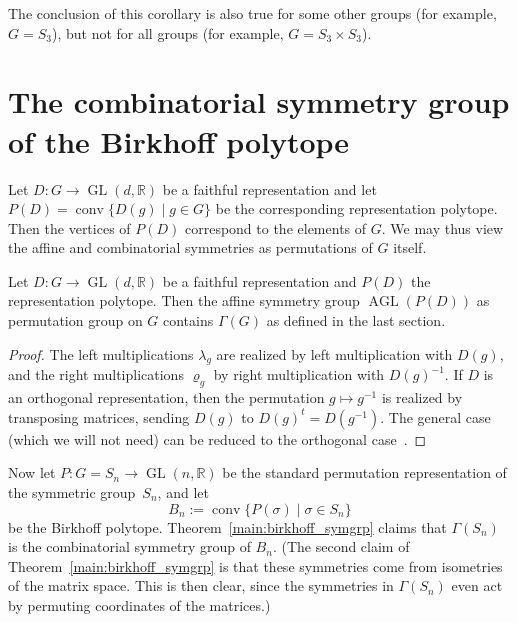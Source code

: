 \documentclass[ALCO,Unicode]{cedram}
\renewcommand{\rho}{\varrho}
\newcommand{\reals}{\mathbb{R}}
\DeclareMathOperator{\GL}{GL}
\DeclareMathOperator{\AGL}{AGL}
\DeclareMathOperator{\conv}{conv}
\begin{document}
The conclusion of this corollary is also true for some other
groups (for example, $G=S_3$),
but not for all groups (for example, $G= S_3 \times S_3$).

\section{The combinatorial symmetry group of the Birkhoff polytope}
Let $D\colon G \to \GL(d,\reals)$ be a faithful representation
and let $P(D) = \conv\{ D(g) \mid g\in G \}$
be the corresponding representation polytope.
Then the vertices of $P(D)$ correspond to the elements of $G$.
We may thus view the affine and combinatorial symmetries
as permutations of $G$ itself.

\begin{lemma}\label{l:reppoltrivsyms}
  Let 
  $D\colon G\to \GL(d,\reals)$
  be a faithful representation
  and $P(D)$ the representation polytope.  
  Then the affine symmetry group $\AGL(P(D))$ 
  as permutation group on $G$ contains 
  $\Gamma(G)$ as defined in the last section.
\end{lemma}

\begin{proof}
  The left multiplications $\lambda_g$ are realized
  by left multiplication with 
  $D(g)$, and the right multiplications $\rho_g$
  by right multiplication with $D(g)^{-1}$.
  If $D$ is an orthogonal representation, then the 
  permutation $g\mapsto g^{-1}$ is realized by transposing 
  matrices, sending $D(g) $ to $D(g)^t = D(g^{-1})$.
  The general case (which we will not need)
  can be reduced to the orthogonal 
  case~\cite[Prop.~6.4]{FrieseLadisch16}.
\end{proof}



Now let $P\colon G= S_n \to \GL(n,\reals)$ be the 
standard permutation representation of 
the symmetric group~$S_n$, and let
\[ B_n := \conv\{ P(\sigma) \mid \sigma\in S_n\}
\]
be the Birkhoff polytope.
Theorem~\ref{main:birkhoff_symgrp} claims that 
$\Gamma(S_n)$ is the combinatorial symmetry group of
$B_n$.
(The second claim of Theorem~\ref{main:birkhoff_symgrp} is that
these symmetries come from isometries of the matrix space.
This is then clear, since
the symmetries in $\Gamma(S_n)$ even act by permuting coordinates of
the matrices.)
\end{document}
